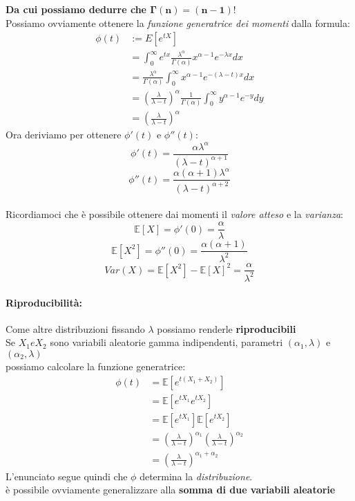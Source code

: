 \documentclass[]{article}
\newcommand{\ev}{\mathbb{E}[X]}
\renewcommand{\ev}[1]{\mathbb{E}[#1]}
\begin{document}
    \textbf{Da cui possiamo dedurre che $\boldsymbol{\Gamma(n) = (n-1)!}$} \\
    \linebreak[4]
    Possiamo ovviamente ottenere la \textit{funzione generatrice dei momenti} dalla formula:
    \begin{equation}
        \begin{aligned}
            \phi(t) & :=E\left[e^{t X}\right] \\
            & =\int_0^{\infty} e^{t x} \frac{\lambda^\alpha}{\Gamma(\alpha)} x^{\alpha-1} e^{-\lambda x} d x \\
            & =\frac{\lambda^\alpha}{\Gamma(\alpha)} \int_0^{\infty} x^{\alpha-1} e^{-(\lambda-t) x} d x \\
            & =\left(\frac{\lambda}{\lambda-t}\right)^\alpha \frac{1}{\Gamma(\alpha)} \int_0^{\infty} y^{\alpha-1} e^{-y} d y \\
            & =\left(\frac{\lambda}{\lambda-t}\right)^\alpha
        \end{aligned}
    \end{equation}
    Ora deriviamo per ottenere $\phi'(t)$ e $\phi''(t)$:
    \[ \phi'(t) = \frac{\alpha \lambda^\alpha}{(\lambda - t)^{\alpha + 1}}\]
    \[ \phi''(t) = \frac{\alpha (\alpha + 1) \lambda^\alpha}{(\lambda - t)^{\alpha + 2}} \] \\
    Ricordiamoci che è possibile ottenere dai momenti il \textit{valore atteso} e la \textit{varianza}:
    \[ \ev{X} = \phi'(0) = \frac{\alpha}{\lambda} \]
    \[ \ev{X^2} = \phi''(0) = \frac{\alpha(\alpha + 1)}{\lambda^2} \]
    \[ Var(X) = \ev{X^2} - \ev{X}^2 = \frac{\alpha}{\lambda^2} \]
    \paragraph{Riproducibilità:} Come altre distribuzioni fissando $\lambda$ possiamo renderle \textbf{riproducibili} \\
    Se $X_1 e X_2$ sono variabili aleatorie gamma indipendenti, parametri $(\alpha_1, \lambda)$ e $(\alpha_2, \lambda)$ \\
    possiamo calcolare la funzione generatrice:
    \begin{equation*}
        \begin{split}
            \phi(t) &= \ev{e^{t(X_1 + X_2)}} \\
            &= \ev{e^{tX_1} e^{tX_2}} \\
            &= \ev{e^{tX_1}} \ev{e^{tX_2}} \\
            &= (\frac{\lambda}{\lambda - t})^{\alpha_1} (\frac{\lambda}{\lambda - t})^{\alpha_2} \\
            &= (\frac{\lambda}{\lambda - t})^{\alpha_1 + \alpha_2}
        \end{split}
    \end{equation*}
    L'enunciato segue quindi che $\phi$ determina la \textit{distribuzione}. \\
    è possibile ovviamente generalizzare alla \textbf{somma di due variabili aleatorie}
\end{document}
